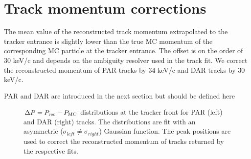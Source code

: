\section{Track momentum corrections}

The mean value of the reconstructed track momentum extrapolated to the tracker entrance is
slightly lower than the true MC momentum of the corresponding MC particle at the tracker entrance.
The offset is on the order of 30 keV/c and depends on the ambiguity resolver used in the track fit.
We correct the reconstructed momentum of PAR tracks by 34 keV/c and DAR tracks by 30 keV/c.

{\blue PAR and DAR are introduced in the next section but should be defined here}

\begin{figure}[h]
\hspace{-0.6in}

\caption{
  \label{fig:sindrum_ii_fig_08_fit} 
  $\Delta P = P_{\rm rec} - P_{\rm MC}$ distributions at the tracker front for PAR (left) and DAR (right) tracks.
  The distributions are fit with an asymmetric ($\sigma_{left} \ne \sigma_{right}$) Gaussian function. 
  The peak positions are used to correct the reconstructed momentum of tracks returned by the respective fits.
}
\end{figure}


